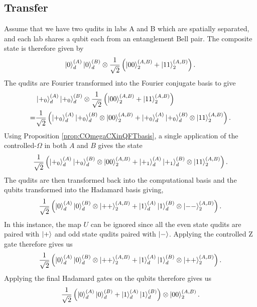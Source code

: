 \subsection{Transfer}
\label{subsection:aqcstorage}
Assume that we have two qudits in labs A and B which are spatially separated, and each lab shares a qubit each from an entanglement Bell pair. The composite state is therefore given by
\begin{equation}
    \ket{0}^{(A)}_d\ket{0}^{(B)}_d\otimes\frac{1}{\sqrt{2}}\left(\ket{00}_2^{(A,B)} + \ket{11}_2^{(A,B)}\right).
\end{equation}
The qudits are Fourier transformed into the Fourier conjugate basis to give
\begin{align}
    &\ket{+_0}^{(A)}_d\ket{+_0}^{(B)}_d\otimes\frac{1}{\sqrt{2}}\left(\ket{00}_2^{(A,B)} + \ket{11}_2^{(A,B)}\right)\\
    =&\frac{1}{\sqrt{2}}\left(
        \ket{+_0}^{(A)}_d\ket{+_0}^{(B)}_d \otimes \ket{00}_2^{(A,B)}
        +\ket{+_0}^{(A)}_d\ket{+_0}^{(B)}_d \otimes \ket{11}_2^{(A,B)}
        \right).
\end{align}
Using Proposition \ref{prop:COmegaCXinQFTbasis}, a single application of the controlled-$\Omega$ in both $A$ and $B$ gives the state
\begin{equation}
    \frac{1}{\sqrt{2}}\left(
        \ket{+_0}^{(A)}_d\ket{+_0}^{(B)}_d \otimes \ket{00}_2^{(A,B)}
        +\ket{+_1}^{(A)}_d\ket{+_1}^{(B)}_d \otimes \ket{11}_2^{(A,B)}
        \right).
\end{equation}
The qudits are then transformed back into the computational basis and the qubits transformed into the Hadamard basis giving,
\begin{equation}
    \frac{1}{\sqrt{2}}\left(
        \ket{0}^{(A)}_d\ket{0}^{(B)}_d \otimes \ket{++}_2^{(A,B)}
        +\ket{1}^{(A)}_d\ket{1}^{(B)}_d \otimes \ket{--}_2^{(A,B)}
        \right).
\end{equation}
In this instance, the map $U$ can be ignored since all the even state qudits are paired with $\ket{+}$ and odd state qudits paired with $\ket{-}$. Applying the controlled Z gate therefore gives us
\begin{equation}
    \frac{1}{\sqrt{2}}\left(
        \ket{0}^{(A)}_d\ket{0}^{(B)}_d \otimes \ket{++}_2^{(A,B)}
        +\ket{1}^{(A)}_d\ket{1}^{(B)}_d \otimes \ket{++}_2^{(A,B)}
        \right).
\end{equation}
Applying the final Hadamard gates on the qubits therefore gives us
\begin{equation}
    \label{eq:singletransferfinalstate}
    \frac{1}{\sqrt{2}}\left(
        \ket{0}^{(A)}_d\ket{0}^{(B)}_d +\ket{1}^{(A)}_d\ket{1}^{(B)}_d\right) \otimes \ket{00}_2^{(A,B)}.
\end{equation}

